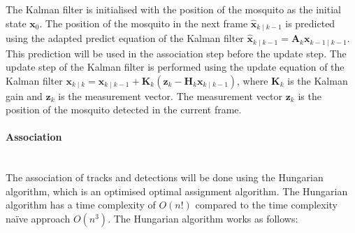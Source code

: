 The Kalman filter is initialised with the position of the mosquito as the initial state $\mathbf{x}_0$. The position of the mosquito in the next frame $\mathbf{\hat{x}}_{k\mid k-1}$ is predicted using the adapted predict equation of the Kalman filter $\mathbf{\hat{x}}_{k\mid k-1} = \mathbf{A}_k \mathbf{x}_{k-1\mid k-1}$. This prediction will be used in the association step before the update step. The update step of the Kalman filter is performed using the update equation of the Kalman filter $\mathbf{x}_{k\mid k} = \mathbf{x}_{k\mid k-1} + \mathbf{K}_k \left(\mathbf{z}_k - \mathbf{H}_k \mathbf{x}_{k\mid k-1}\right)$, where $\mathbf{K}_k$ is the Kalman gain and $\mathbf{z}_k$ is the measurement vector. The measurement vector $\mathbf{z}_k$ is the position of the mosquito detected in the current frame.


\paragraph{Association}\mbox{}\\
The association of tracks and detections will be done using the Hungarian algorithm, which is an optimised optimal assignment algorithm. The Hungarian algorithm has a time complexity of $O\left(n!\right)$ compared to the time complexity na\"ive approach $O\left(n^3\right)$. The Hungarian algorithm works as follows:
